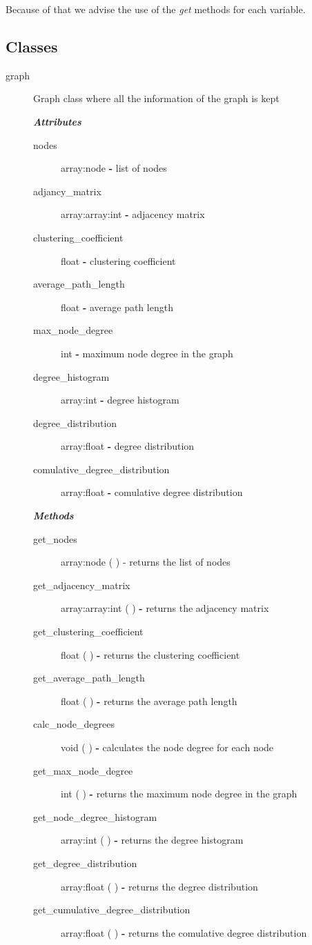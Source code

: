 \documentclass[a4paper,titlepage,11pt]{article}
\begin{document}
Because of that we advise the use of the \textit{get} methods for each variable.

\subsection*{Classes}
\begin{description}
\item [graph] Graph class where all the information of the graph is kept

\textit{ \textbf{Attributes} }
\begin{description}
\item [ nodes ] array:node \textbf{-} list of nodes
\item [ adjancy\_matrix ] array:array:int \textbf{-} adjacency matrix
\item [ clustering\_coefficient ] float \textbf{-} clustering coefficient
\item [ average\_path\_length ] float \textbf{-} average path length
\item [ max\_node\_degree ] int \textbf{-} maximum node degree in the graph
\item [ degree\_histogram ] array:int \textbf{-} degree histogram
\item [ degree\_distribution ] array:float \textbf{-} degree distribution
\item [ comulative\_degree\_distribution ] array:float \textbf{-} comulative degree distribution
\end{description}

\textit{ \textbf{Methods} }
\begin{description}
\item [get\_nodes] array:node ( ) - returns the list of nodes
\item [get\_adjacency\_matrix] array:array:int ( ) \textbf{-} returns the adjacency matrix
\item [get\_clustering\_coefficient] float ( ) \textbf{-} returns the clustering coefficient
\item [get\_average\_path\_length] float ( ) \textbf{-} returns the average path length
\item [calc\_node\_degrees] void ( ) \textbf{-} calculates the node degree for each node
\item [get\_max\_node\_degree] int ( ) \textbf{-} returns the maximum node degree in the graph
\item [get\_node\_degree\_histogram] array:int ( ) \textbf{-} returns the degree histogram
\item [get\_degree\_distribution] array:float ( ) \textbf{-} returns the degree distribution
\item [get\_cumulative\_degree\_distribution] array:float ( ) \textbf{-} returns the comulative degree distribution
\end{description}


\end{description}
\end{document}
